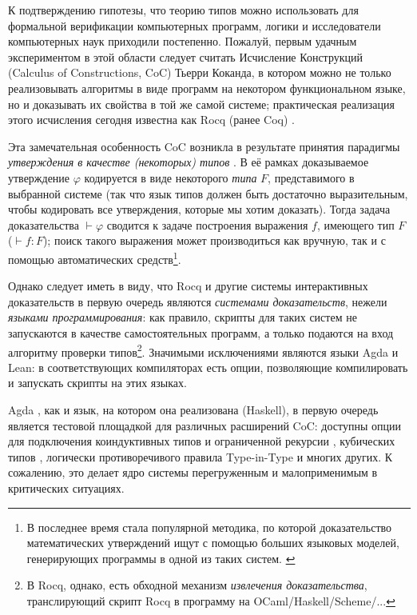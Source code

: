 
К подтверждению гипотезы, что теорию типов можно
использовать для формальной верификации компьютерных
программ, логики и исследователи компьютерных наук
приходили постепенно. Пожалуй, первым удачным
экспериментом в этой области следует считать Исчисление
Конструкций (Calculus of Constructions, CoC)
\cite{COQUAND198895} Тьерри Коканда, в котором можно не
только реализовывать алгоритмы в виде программ на
некотором функциональном языке, но и доказывать их
свойства в той же самой системе; практическая реализация
этого исчисления сегодня известна как Rocq (ранее Coq)
\cite{the_coq_development_team_2024_14542673}.

Эта замечательная особенность CoC возникла в результате
принятия парадигмы \textit{утверждения в качестве
(некоторых) типов} \cite{wadler2015}. В её рамках
доказываемое утверждение $\varphi$ кодируется в виде
некоторого \textit{типа} $F$, представимого в выбранной
системе (так что язык типов должен быть достаточно
выразительным, чтобы кодировать все утверждения, которые
мы хотим доказать). Тогда задача доказательства
$\vdash\varphi$ сводится к задаче построения выражения
$f$, имеющего тип $F$ ($\vdash f:F$); поиск такого
выражения может производиться как вручную, так и с помощью
автоматических средств\footnote{В последнее время стала
популярной методика, по которой доказательство
математических утверждений ищут с помощью больших языковых
моделей, генерирующих программы в одной из таких систем.
\cite{song2025leancopilotlargelanguage}}.

Однако следует иметь в виду, что Rocq и другие системы
интерактивных доказательств в первую очередь являются
\textit{системами доказательств}, нежели \textit{языками
программирования}: как правило, скрипты для таких систем
не запускаются в качестве самостоятельных программ, а
только подаются на вход алгоритму проверки
типов\footnote{В Rocq, однако, есть обходной механизм
\textit{извлечения доказательства}, транслирующий скрипт
Rocq в программу на OCaml/Haskell/Scheme/...}. Значимыми
исключениями являются языки Agda и Lean: в соответствующих
компиляторах есть опции, позволяющие компилировать и
запускать скрипты на этих языках.

Agda \cite{norell:thesis}, как и язык, на котором она
реализована (Haskell), в первую очередь является тестовой
площадкой для различных расширений CoC: доступны опции для
подключения коиндуктивных типов \cite{AltenkirchD10} и
ограниченной рекурсии
\cite{clouston2015programmingreasoningguardedrecursion},
кубических типов \cite{vezzosi2019cubical}, логически
противоречивого правила Type-in-Type и многих других.
К сожалению, это делает ядро системы перегруженным и
малоприменимым в критических ситуациях.

